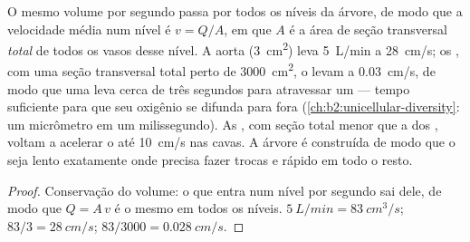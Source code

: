 \begin{theorem}\label{thm:b2:blood-circulation:continuity}
O mesmo volume por segundo passa por todos os níveis da árvore, de modo
que a velocidade média num nível é $v = Q/A$, em que $A$ é a área de
seção transversal \emph{total} de todos os vasos desse nível. A aorta
(\qty{3}{cm^2}) leva \qty{5}{L/min} a \qty{28}{cm/s}; os ,
com uma seção transversal total perto de \qty{3000}{cm^2}, o levam a
\qty{0.03}{cm/s}, de modo que uma  leva cerca de três segundos para
atravessar um  --- tempo suficiente para que seu oxigênio se
difunda para fora (\cref{ch:b2:unicellular-diversity}: um micrômetro em um milissegundo). As
, com seção total menor que a dos , voltam a acelerar o
 até \qty{10}{cm/s} nas  cavas. A árvore é construída de
modo que o  seja lento exatamente onde precisa fazer trocas e
rápido em todo o resto.
\end{theorem}
\begin{proof}
Conservação do volume: o que entra num nível por segundo sai dele, de
modo que $Q = A\,v$ é o mesmo em todos os níveis. $\qty{5}{L/min} =
\qty{83}{cm^3/s}$; $83/3 = \qty{28}{cm/s}$; $83/3000 =
\qty{0.028}{cm/s}$.
\end{proof}


